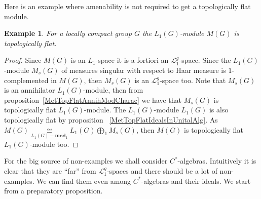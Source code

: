 \documentclass[12pt]{article}
\newtheorem{example}[theorem]{Example}
\newcommand{\isom}[1]{\mathop{\mathbin{\cong}}\limits_{#1}}
\begin{document}
Here is an example where amenability is not required to get a topologically flat
module.

\begin{example} For a locally compact group $G$ the $L_1(G)$-module $M(G)$ is
topologically flat.
\end{example}
\begin{proof}
Since $M(G)$ is an $L_1$-space it is a fortiori an $\mathcal{L}_1^g$-space.
Since the $L_1(G)$-module $M_s(G)$ of measures singular with respect to Haar
measure is $1$-complemented in $M(G)$, then $M_s(G)$ is an
$\mathcal{L}_1^g$-space too. Note that $M_s(G)$ is an annihilator
$L_1(G)$-module, then from proposition~\ref{MetTopFlatAnnihModCharac} we have
that $M_s(G)$ is topologically flat $L_1(G)$-module. The $L_1(G)$-module
$L_1(G)$ is also topologically flat by proposition
~\ref{MetTopFlatIdealsInUnitalAlg}. As
$M(G)\isom{L_1(G)-\mathbf{mod}_1}L_1(G)\bigoplus_1 M_s(G)$, then $M(G)$ is
topologically flat $L_1(G)$-module too.
\end{proof}

For the big source of non-examples we shall consider $C^*$-algebras. Intuitively
it is clear that they are ``far'' from $\mathcal{L}_1^g$-spaces and there should
be a lot of non-examples. We can find them even among $C^*$-algebras and their
ideals. We start from a preparatory proposition.
\end{document}
